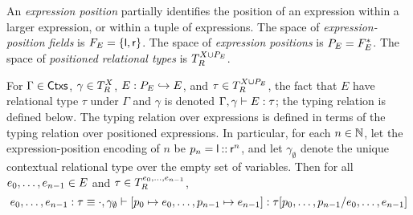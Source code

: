 An \emph{expression position} partially identifies the position of an
expression within a larger expression, or within a tuple of
expressions.
%
The space of \emph{expression-position fields} is
$\expposfields = \elts{ \leftchild, \rightchild }$.
%
The space of \emph{expression positions} is
$\exppos = \expposfields^{*}$.
% 
The space of \emph{positioned relational types} is
$\reltypes{\vars \union \exppos}$.

For $\Gamma \in \ctxs$, $\gamma \in \ctxreltypes$,
$E : \exppos \partto \expr$, and $\tau \in \posreltypes$, the fact
that $E$ have relational type $\tau$ under $\Gamma$ and $\gamma$ is
denoted $\Gamma, \gamma \judges E : \tau$;
%
the typing relation is defined below.
%
The typing relation over expressions is defined in terms of the typing
relation over positioned expressions.
%
In particular, for each $n \in \nats$, let the expression-position
encoding of $n$ be $\pos{n} = \leftchild \cons \rightchild^{n}$, and
let $\gamma_{\emptyset}$ denote the unique contextual relational type
over the empty set of variables.
%
Then for all $e_0, \ldots, e_{n - 1} \in \expr$ and
$\tau \in \reltypes{ e_0, \ldots, e_{n - 1} }$,
\[ e_0, \ldots, e_{n - 1} : \tau \equiv \cdot, \gamma_{\emptyset}
  \judges [ \pos{0} \mapsto e_0, \ldots, \pos{n - 1} \mapsto e_{n - 1}
  ] : \replace{ \tau }{ e_0, \ldots, e_{n - 1} }{ \pos{0}, \ldots,
    \pos{n - 1} } \]

